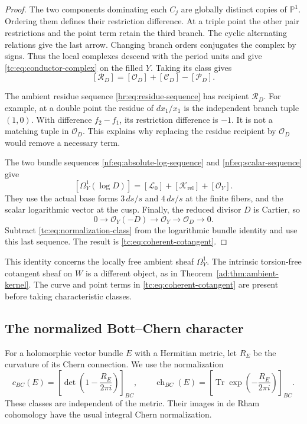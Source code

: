 \begin{proof}
The two components dominating each $C_j$ are globally distinct
copies of $\mathbb P^1$. Ordering them defines their restriction
difference. At a triple point the other pair restrictions and
the point term retain the third branch.
The cyclic alternating relations give the last arrow.
Changing branch orders conjugates the complex by signs.
Thus the local complexes descend with the period units and give
\eqref{tc:eq:conductor-complex} on the filled $Y$.
Taking its class gives
\begin{equation}\label{tc:eq:normalization-class}
            [\mathcal R_D]=[\mathcal O_D]
                               +[\mathcal C_D]-[\mathcal P_D].
\end{equation}

The ambient residue sequence \eqref{hr:eq:residue-sequence}
has recipient $\mathcal R_D$.
For example, at a double point the residue of $dx_1/x_1$
is the independent branch tuple $(1,0)$.
With difference $f_2-f_1$, its restriction difference is $-1$.
It is not a matching tuple in $\mathcal O_D$.
This explains why replacing the residue recipient by
$\mathcal O_D$ would remove a necessary term.

The two bundle sequences
\eqref{nf:eq:absolute-log-sequence} and
\eqref{nf:eq:scalar-sequence} give
\[
 [\Omega_Y^1(\log D)]
       =[\mathcal L_0]+[\mathcal K_{\mathrm{rel}}]+[\mathcal O_Y].
\]
They use the actual base forms $3\,ds/s$ and $4\,ds/s$ at
the finite fibers, and the scalar logarithmic vector at the cusp.
Finally, the reduced divisor $D$ is Cartier, so
\[
 0\longrightarrow\mathcal O_Y(-D)
 \longrightarrow\mathcal O_Y\longrightarrow\mathcal O_D
 \longrightarrow0.
\]
Subtract \eqref{tc:eq:normalization-class} from the logarithmic
bundle identity and use this last sequence.
The result is \eqref{tc:eq:coherent-cotangent}.
\end{proof}

This identity concerns the locally free ambient sheaf $\Omega_Y^1$.
The intrinsic torsion-free cotangent sheaf on $W$ is a different
object, as in Theorem~\ref{ad:thm:ambient-kernel}.
The curve and point terms in \eqref{tc:eq:coherent-cotangent}
are present before taking characteristic classes.

\subsection{The normalized Bott--Chern character}

For a holomorphic vector bundle $E$ with a Hermitian metric,
let $R_E$ be the curvature of its Chern connection.
We use the normalization
\begin{equation}\label{tc:eq:character-normalization}
 c_{BC}(E)=\left[\det\left(1-\frac{R_E}{2\pi i}\right)\right]_{BC},
 \qquad
 \operatorname{ch}_{BC}(E)
     =\left[\operatorname{Tr}\exp\left(-\frac{R_E}{2\pi i}\right)
       \right]_{BC}.
\end{equation}
These classes are independent of the metric.
Their images in de Rham cohomology have the usual integral
Chern normalization.

